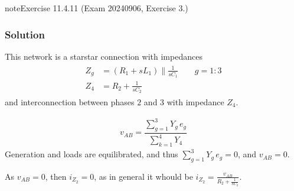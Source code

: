 \documentclass[letterpaper,10pt,english]{jupyterBook}
\begin{document}
\begin{sphinxadmonition}{note}{Exercise 11.4.11 (Exam 2024\sphinxhyphen{}09\sphinxhyphen{}06, Exercise 3.)}



\begin{figure}[htbp]
\centering

\noindent{}
\end{figure}
\subsubsection*{Solution}

\sphinxAtStartPar
This network is a star\sphinxhyphen{}star connection with impedances
\begin{equation*}
\begin{split}\begin{aligned}
  Z_g & = ( R_1 + s L_1 ) \parallel \frac{1}{s C_1} \qquad g = 1:3 \\
  Z_4 & = R_2 + \frac{1}{s C_2}
\end{aligned}\end{split}
\end{equation*}
\sphinxAtStartPar
and inter\sphinxhyphen{}connection between phases \(2\) and \(3\) with impedance \(Z_4\).



\sphinxAtStartPar
{}
\begin{equation*}
\begin{split}v_{AB} = \dfrac{ \sum_{g=1}^{3} Y_g \, e_g }{\sum_{k=1}^{4} Y_4}\end{split}
\end{equation*}
\sphinxAtStartPar
Generation and loads are equilibrated, and thus \(\sum_{g=1}^{3} Y_g \, e_g = 0\), and \(v_{AB} = 0\).

\sphinxAtStartPar
{} As \(v_{AB}=0\), then \(i_{Z_2} = 0\), as in general it whould be \(i_{Z_2} = \frac{v_{AB}}{R_2 + \frac{1}{sC_2}}\).


\end{sphinxadmonition}
\end{document}
